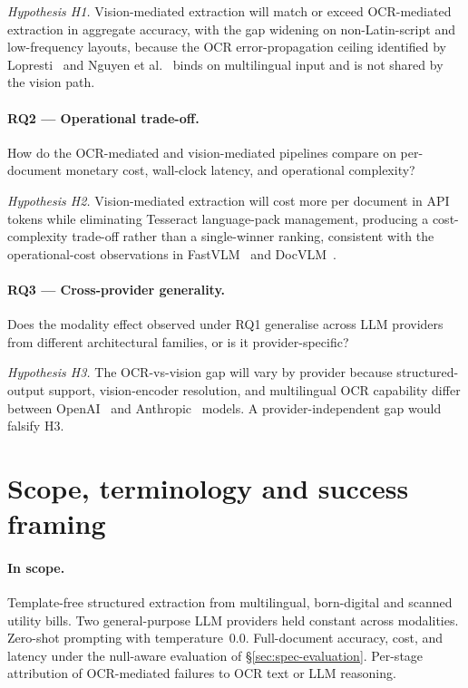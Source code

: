 \textit{Hypothesis H1.} Vision-mediated extraction will match or
exceed OCR-mediated extraction in aggregate accuracy, with the gap
widening on non-Latin-script and low-frequency layouts, because the
OCR error-propagation ceiling identified by
Lopresti~\cite{lopresti2009ocrerrors} and Nguyen et
al.~\cite{nguyen2021postocr} binds on multilingual input and is not
shared by the vision path.

\paragraph{RQ2 --- Operational trade-off.} How do the OCR-mediated
and vision-mediated pipelines compare on per-document monetary
cost, wall-clock latency, and operational complexity?

\textit{Hypothesis H2.} Vision-mediated extraction will cost more
per document in API tokens while eliminating Tesseract language-pack
management, producing a cost-complexity trade-off rather than a
single-winner ranking, consistent with the operational-cost
observations in FastVLM~\cite{vasu2024fastvlm} and
DocVLM~\cite{nacson2024docvlm}.

\paragraph{RQ3 --- Cross-provider generality.} Does the modality
effect observed under RQ1 generalise across LLM providers from
different architectural families, or is it provider-specific?

\textit{Hypothesis H3.} The OCR-vs-vision gap will vary by provider
because structured-output support, vision-encoder resolution, and
multilingual OCR capability differ between
OpenAI~\cite{openai2024gpt4o,openai2024structured} and
Anthropic~\cite{anthropic2024claude} models. A provider-independent
gap would falsify H3.

\section{Scope, terminology and success framing}
\label{sec:spec-scope}

\paragraph{In scope.} Template-free structured extraction from
multilingual, born-digital and scanned utility bills. Two
general-purpose LLM providers held constant across modalities.
Zero-shot prompting with temperature~$0.0$. Full-document accuracy,
cost, and latency under the null-aware evaluation of
\S\ref{sec:spec-evaluation}. Per-stage attribution of OCR-mediated
failures to OCR text or LLM reasoning.

